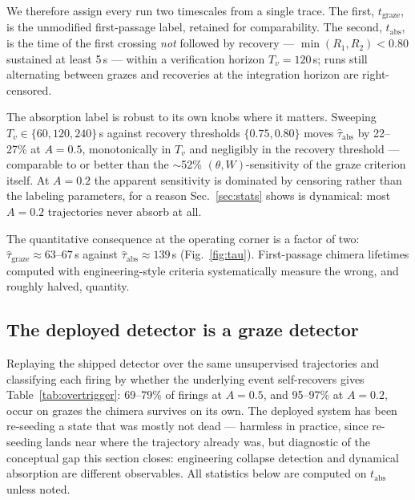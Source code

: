 \documentclass[pdflatex,sn-mathphys,Numbered]{sn-jnl}
\begin{document}
We therefore assign every run two timescales from a single trace. The first,
$t_{\mathrm{graze}}$, is the unmodified first-passage label, retained for
comparability. The second, $t_{\mathrm{abs}}$, is the time of the first crossing
\emph{not} followed by recovery --- $\min(R_1, R_2) < 0.80$ sustained at least
5\,s --- within a verification horizon $T_v = 120$\,s; runs still alternating
between grazes and recoveries at the integration horizon are right-censored.

The absorption label is robust to its own knobs where it matters. Sweeping
$T_v \in \{60, 120, 240\}$\,s against recovery thresholds $\{0.75, 0.80\}$ moves
$\hat\tau_{\mathrm{abs}}$ by 22--27\% at $A = 0.5$, monotonically in $T_v$ and
negligibly in the recovery threshold --- comparable to or better than the
$\sim$52\% $(\theta, W)$-sensitivity of the graze criterion itself. At $A = 0.2$
the apparent sensitivity is dominated by censoring rather than the labeling
parameters, for a reason Sec.~\ref{sec:stats} shows is dynamical: most $A = 0.2$
trajectories never absorb at all.

The quantitative consequence at the operating corner is a factor of two:
$\hat\tau_{\mathrm{graze}} \approx 63$--$67$\,s against
$\hat\tau_{\mathrm{abs}} \approx 139$\,s (Fig.~\ref{fig:tau}). First-passage chimera
lifetimes computed with engineering-style criteria systematically measure the wrong,
and roughly halved, quantity.

\subsection{The deployed detector is a graze detector}

Replaying the shipped detector over the same unsupervised trajectories and
classifying each firing by whether the underlying event self-recovers gives
Table~\ref{tab:overtrigger}: 69--79\% of firings at $A = 0.5$, and 95--97\% at
$A = 0.2$, occur on grazes the chimera survives on its own. The deployed system has
been re-seeding a state that was mostly not dead --- harmless in practice, since
re-seeding lands near where the trajectory already was, but diagnostic of the
conceptual gap this section closes: engineering collapse detection and dynamical
absorption are different observables. All statistics below are computed on
$t_{\mathrm{abs}}$ unless noted.
\end{document}
